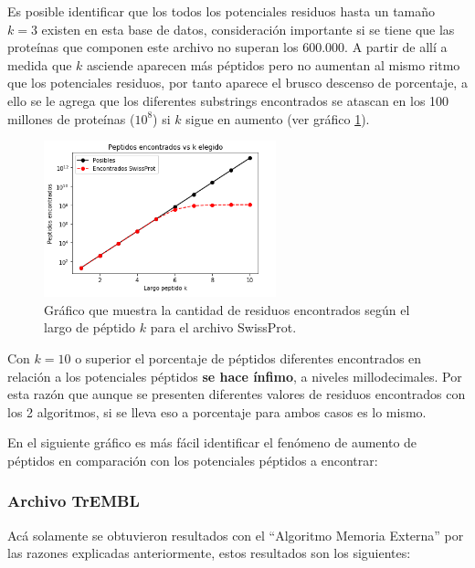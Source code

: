 Es posible identificar que los todos los potenciales residuos hasta un tamaño $k=3$ existen en esta base de datos, consideración importante si se tiene que las proteínas que componen este archivo no superan los 600.000. A partir de allí a medida que $k$ asciende aparecen más péptidos pero no aumentan al mismo ritmo que los potenciales residuos, por tanto aparece el brusco descenso de porcentaje, a ello se le agrega que los diferentes substrings encontrados se atascan en los 100 millones de proteínas ($10^{8}$) si $k$ sigue en aumento (ver gráfico \ref{fig:sprot}).

\begin{figure}[h]
    \centering
    \includegraphics[width=0.6\textwidth]{./images/swissprotv1.png}
    \caption{Gráfico que muestra la cantidad de residuos encontrados según el largo de péptido $k$ para el archivo SwissProt.}
    \label{fig:sprot}
\end{figure}

Con $k=10$ o superior el porcentaje de péptidos diferentes encontrados en relación a los potenciales péptidos \textbf{se hace ínfimo}, a niveles millodecimales. Por esta razón que aunque se presenten diferentes valores de residuos encontrados con los 2 algoritmos, si se lleva eso a porcentaje para ambos casos es lo mismo.

En el siguiente gráfico es más fácil identificar el fenómeno de aumento de péptidos en comparación con los potenciales péptidos a encontrar:


\subsubsection{Archivo TrEMBL}

Acá solamente se obtuvieron resultados con el ``Algoritmo Memoria Externa'' por las razones explicadas anteriormente, estos resultados son los siguientes:

